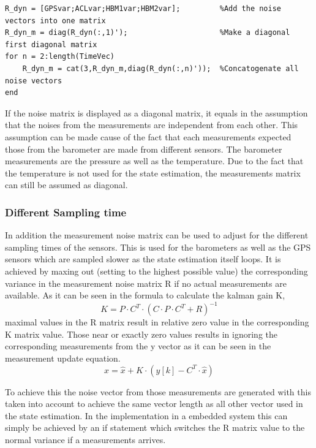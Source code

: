 \begin{lstlisting}[caption={Mesurements noise matrix conagonating}]
R_dyn = [GPSvar;ACLvar;HBM1var;HBM2var];         %Add the noise vectors into one matrix
R_dyn_m = diag(R_dyn(:,1)');                     %Make a diagonal first diagonal matrix
for n = 2:length(TimeVec)
    R_dyn_m = cat(3,R_dyn_m,diag(R_dyn(:,n)'));  %Concatogenate all noise vectors 
end
\end{lstlisting}


If the noise matrix is displayed as a diagonal matrix, 
it equals in the assumption that the noises from the measurements are independent from each other.
This assumption can be made cause of the fact that each measurements expected those from the barometer are made from different sensors.
The barometer measurements are the pressure as well as the temperature.
Due to the fact that the temperature is not used for the state estimation, the measurements matrix can still be assumed as diagonal.

\subsubsection{Different Sampling time}
In addition the measurement noise matrix can be used to adjust for the different sampling times of the sensors.
This is used for the barometers as well as the GPS sensors which are sampled slower as the state estimation itself loops.
It is achieved by maxing out (setting to the highest possible value) the corresponding variance in the measurement noise matrix R if no actual measurements are available.
As it can be seen in the formula to calculate the kalman gain K, 
$$  K = P\cdot C^T\cdot (C\cdot P\cdot C^T + R)^{-1} $$
maximal values in the R matrix result in relative zero value in the corresponding K matrix value.
Those near or exactly zero values results in ignoring the corresponding measurements from the y vector as it can be seen in the measurement update equation.
$$  x = \hat{x} + K\cdot(y[k] - C^T \cdot \hat{x}) $$

To achieve this the noise vector from those measurements are generated with this taken into account to achieve the same vector length as all other vector used in the state estimation.
In the implementation in a embedded system this can simply be achieved by an if statement which switches the R matrix value to the normal variance if a measurements arrives.

